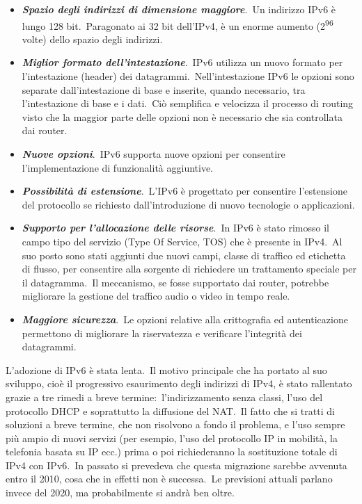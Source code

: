 \begin{itemize}
    \item \textbf{\emph{Spazio degli indirizzi di dimensione maggiore}}.\
          Un indirizzo IPv6 è lungo 128 bit.\
          Paragonato ai 32 bit dell'IPv4, è un enorme aumento (2\textsuperscript{96} volte) dello spazio degli indirizzi.
    \item \textbf{\emph{Miglior formato dell'intestazione}}.\
          IPv6 utilizza un nuovo formato per l'intestazione (header) dei datagrammi.\
          Nell'intestazione IPv6 le opzioni sono separate dall'intestazione di base e inserite, quando necessario, tra l'intestazione di base e i dati.\
          Ciò semplifica e velocizza il processo di routing visto che la maggior parte delle opzioni non è necessario che sia controllata dai router.
    \item \textbf{\emph{Nuove opzioni}}.\
          IPv6 supporta nuove opzioni per consentire l'implementazione di funzionalità aggiuntive.
    \item \textbf{\emph{Possibilità di estensione}}.\
          L'IPv6 è progettato per consentire l'estensione del protocollo se richiesto dall'introduzione di nuovo tecnologie o applicazioni.
    \item \textbf{\emph{Supporto per l'allocazione delle risorse}}.\
          In IPv6 è stato rimosso il campo tipo del servizio (Type Of Service, TOS) che è presente in IPv4.\
          Al suo posto sono stati aggiunti due nuovi campi, classe di traffico ed etichetta di flusso, per consentire alla sorgente di richiedere un trattamento speciale per il datagramma.\
          Il meccanismo, se fosse supportato dai router, potrebbe migliorare la gestione del traffico audio o video in tempo reale.
    \item \textbf{\emph{Maggiore sicurezza}}.\
          Le opzioni relative alla crittografia ed autenticazione permettono di migliorare la riservatezza e verificare l'integrità dei datagrammi.
\end{itemize}
L'adozione di IPv6 è stata lenta.\
Il motivo principale che ha portato al suo sviluppo, cioè il progressivo esaurimento degli indirizzi di IPv4, è stato rallentato grazie a tre rimedi a breve termine:\ l'indirizzamento senza classi, l'uso del protocollo DHCP e soprattutto la diffusione del NAT.\
Il fatto che si tratti di soluzioni a breve termine, che non risolvono a fondo il problema, e l'uso sempre più ampio di nuovi servizi (per esempio, l'uso del protocollo IP in mobilità, la telefonia basata su IP ecc.) prima o poi richiederanno la sostituzione totale di IPv4 con IPv6.\
In passato si prevedeva che questa migrazione sarebbe avvenuta entro il 2010, cosa che in effetti non è successa.\
Le previsioni attuali parlano invece del 2020, ma probabilmente si andrà ben oltre.

